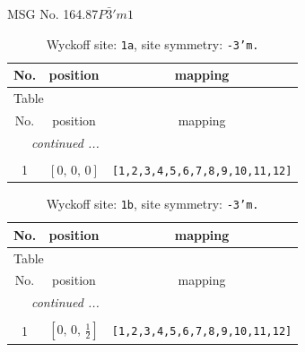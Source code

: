 \documentclass[fleqn,8pt]{jsarticle}
\begin{document}
\setcounter{MaxMatrixCols}{32}

\renewcommand{\tablename}{Table~}
\renewcommand{\figurename}{Figure~}
\begin{center}
\LARGE
MSG No. 164.87\quad$P\bar{3}'m1$
\end{center}
\renewcommand{\arraystretch}{1.2}
\begin{longtable}{ccc}
\caption{Wyckoff site: {\tt 1a}, site symmetry: {\tt -3'm.}}
 \\
 \hline \hline
No. & position & mapping \\ \hline \endfirsthead

\multicolumn{2}{l}{\tablename\ \thetable{}} \\
 \hline \hline
No. & position & mapping \\ \hline \endhead

 \hline \hline
\multicolumn{2}{r}{\footnotesize\it continued ...} \\ \endfoot

 \hline \hline
\multicolumn{2}{r}{} \\ \endlastfoot

1 & $\left[ 0,\, 0,\, 0 \right]$ & {\tt [1,2,3,4,5,6,7,8,9,10,11,12]} \\
\end{longtable}
\renewcommand{\arraystretch}{1.2}
\begin{longtable}{ccc}
\caption{Wyckoff site: {\tt 1b}, site symmetry: {\tt -3'm.}}
 \\
 \hline \hline
No. & position & mapping \\ \hline \endfirsthead

\multicolumn{2}{l}{\tablename\ \thetable{}} \\
 \hline \hline
No. & position & mapping \\ \hline \endhead

 \hline \hline
\multicolumn{2}{r}{\footnotesize\it continued ...} \\ \endfoot

 \hline \hline
\multicolumn{2}{r}{} \\ \endlastfoot

1 & $\left[ 0,\, 0,\, \frac{1}{2} \right]$ & {\tt [1,2,3,4,5,6,7,8,9,10,11,12]} \\
\end{longtable}
\renewcommand{\arraystretch}{1.2}
\end{document}
